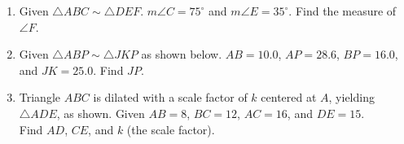 \documentclass[12pt, twoside]{article}
\begin{document}
\begin{enumerate}
\begin{multicols}{2}
\\
      Write each corresponding object.
      \begin{enumerate}
        \item $L \rightarrow$ \rule{2cm}{0.15mm}
        \item $\angle M \cong$ \rule{2cm}{0.15mm}
        \item $QR=$ \rule{2cm}{0.15mm} 
        \item Justify $\triangle KLM \sim \triangle PQR$. Use the words ``maintains angles" and ``dilation''.
      \end{enumerate}
    \end{multicols} \vspace{2cm}
  
    \item Given $\triangle ABC \sim \triangle DEF$. $m\angle C = 75^\circ$ and $m\angle E = 35^\circ$. Find the measure of $\angle F$. \vspace{3cm}
      
    \item Given $\triangle ABP \sim \triangle JKP$ as shown below. $AB=10.0$, $AP=28.6$, $BP=16.0$, and $JK=25.0$. Find $JP$.
      \begin{flushright}
        \end{flushright}
        \vspace{2cm}
  
  \newpage
    \item Triangle $ABC$ is dilated with a scale factor of $k$ centered at $A$, yielding $\triangle ADE$, as shown. Given $AB=8$, $BC=12$, $AC=16$, and $DE=15$. \\[0.25cm] Find $AD$, $CE$, and $k$ (the scale factor).
    \begin{flushright}
    \end{flushright} \vspace{2.5cm}
  

\end{enumerate}
\end{document}
